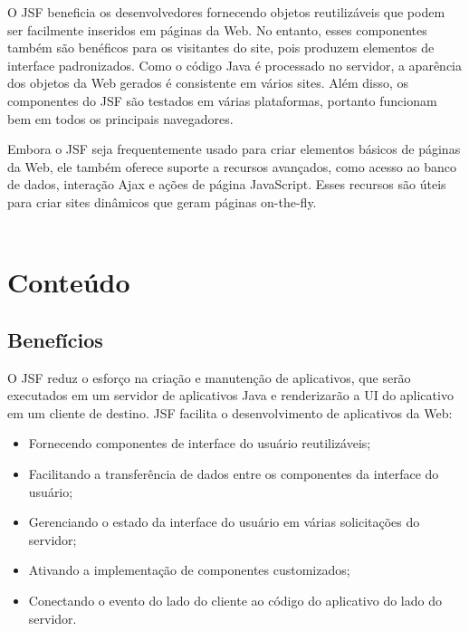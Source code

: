 \documentclass[	DIV=calc,%
							paper=a4,%
							fontsize=12pt,%
							onecolumn]{scrartcl}	 					%
\begin{document}
O JSF beneficia os desenvolvedores fornecendo objetos reutilizáveis que podem ser facilmente inseridos em páginas da Web. No entanto, esses componentes também são benéficos para os visitantes do site, pois produzem elementos de interface padronizados. Como o código Java é processado no servidor, a aparência dos objetos da Web gerados é consistente em vários sites. Além disso, os componentes do JSF são testados em várias plataformas, portanto funcionam bem em todos os principais navegadores.

Embora o JSF seja frequentemente usado para criar elementos básicos de páginas da Web, ele também oferece suporte a recursos avançados, como acesso ao banco de dados, interação Ajax e ações de página JavaScript. Esses recursos são úteis para criar sites dinâmicos que geram páginas on-the-fly.\\~\\





\section{Conteúdo}


\subsection{Benefícios}

O JSF reduz o esforço na criação e manutenção de aplicativos, que serão executados em um servidor de aplicativos Java e renderizarão a UI do aplicativo em um cliente de destino. JSF facilita o desenvolvimento de aplicativos da Web:
\begin{itemize}
\item Fornecendo componentes de interface do usuário reutilizáveis;
\item Facilitando a transferência de dados entre os componentes da interface do usuário;
\item Gerenciando o estado da interface do usuário em várias solicitações do servidor;
\item Ativando a implementação de componentes customizados;
\item Conectando o evento do lado do cliente ao código do aplicativo do lado do servidor.
\end{itemize}
\end{document}
